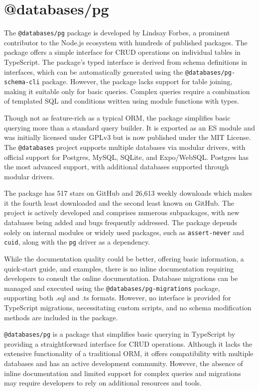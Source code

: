 \section{@databases/pg}
The \texttt{@databases/pg} package is developed by Lindsay Forbes, a prominent
contributor to the Node.js ecosystem with hundreds of published packages. The
package offers a simple interface for CRUD operations on individual tables in
TypeScript. The package's typed interface is derived from schema definitions in
interfaces, which can be automatically generated using the
\texttt{@databases/pg-schema-cli} package. However, the package lacks support
for table joining, making it suitable only for basic queries. Complex queries
require a combination of templated SQL and conditions written using module
functions with types.

Though not as feature-rich as a typical ORM, the package simplifies basic
querying more than a standard query builder. It is exported as an ES module and
was initially licensed under GPLv3 but is now published under the MIT License.
The \texttt{@databases} project supports multiple databases via modular drivers,
with official support for Postgres, MySQL, SQLite, and Expo/WebSQL. Postgres has
the most advanced support, with additional databases supported through modular
drivers.

The package has 517 stars on GitHub and 26,613 weekly downloads which makes it
the fourth least downloaded and the second least known on GitHub. The project is
actively developed and comprises numerous subpackages, with new databases being
added and bugs frequently addressed. The package depends solely on internal
modules or widely used packages, such as \texttt{assert-never} and
\texttt{cuid}, along with the \texttt{pg} driver as a dependency.

While the documentation quality could be better, offering basic information, a
quick-start guide, and examples, there is no inline documentation requiring
developers to consult the online documentation. Database migrations can be
managed and executed using the \texttt{@databases/pg-migrations} package,
supporting both .sql and .ts formats. However, no interface is provided for
TypeScript migrations, necessitating custom scripts, and no schema modification
methods are included in the package.

\texttt{@databases/pg} is a package that simplifies basic querying in TypeScript
by providing a straightforward interface for CRUD operations. Although it lacks
the extensive functionality of a traditional ORM, it offers compatibility with
multiple databases and has an active development community. However, the absence
of inline documentation and limited support for complex queries and migrations
may require developers to rely on additional resources and tools.